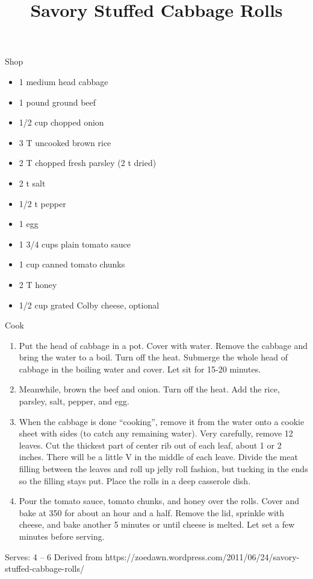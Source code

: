 \documentclass{article}
\title{Savory Stuffed Cabbage Rolls}
\date{\vspace{-5ex}}
\begin{document}
\maketitle

Shop

\begin{itemize}
\item 1 medium head cabbage
\item 1 pound ground beef
\item 1/2 cup chopped onion
\item 3 T uncooked brown rice
\item 2 T chopped fresh parsley (2 t dried)
\item 2 t salt
\item 1/2 t pepper
\item 1 egg
\item 1 3/4 cups plain tomato sauce
\item 1 cup canned tomato chunks
\item 2 T honey
\item 1/2 cup grated Colby cheese, optional
\end{itemize}

Cook

\begin{enumerate}
\item Put the head of cabbage in a pot. Cover with water. Remove the cabbage and bring the water to a boil. Turn off the heat. Submerge the whole head of cabbage in the boiling water and cover. Let sit for 15-20 minutes.
\item Meanwhile, brown the beef and onion. Turn off the heat. Add the rice, parsley, salt, pepper, and egg.
\item When the cabbage is done “cooking”, remove it from the water onto a cookie sheet with sides (to catch any remaining water). Very carefully, remove 12 leaves. Cut the thickest part of center rib out of each leaf, about 1 or 2 inches. There will be a little V in the middle of each leave. Divide the meat filling between the leaves and roll up jelly roll fashion, but tucking in the ends so the filling stays put. Place the rolls in a deep casserole dish.
\item Pour the tomato sauce, tomato chunks, and honey over the rolls. Cover and bake at 350 for about an hour and a half. Remove the lid, sprinkle with cheese, and bake another 5 minutes or until cheese is melted. Let set a few minutes before serving.
\end{enumerate}

Serves: 4 – 6
Derived from https://zoedawn.wordpress.com/2011/06/24/savory-stuffed-cabbage-rolls/
\end{document}
